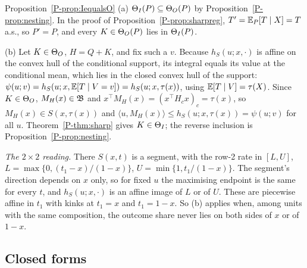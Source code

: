 \begin{proofof}{Proposition~\ref{P-prop:IequalsO}}
(a) $\Theta_I(P)\subseteq\Theta_O(P)$ by Proposition~\ref{P-prop:nesting}. In the proof of
Proposition~\ref{P-prop:sharpreg}, $T'=\mathbb E_P[T\mid X]=T$ a.s., so $P'=P$, and every
$K\in\Theta_O(P)$ lies in $\Theta_I(P)$.

(b) Let $K\in\Theta_O$, $H=Q+K$, and fix such a $v$. Because $h_S(u;x,\cdot)$ is affine on
the convex hull of the conditional support, its integral equals its value at the
conditional mean, which lies in the closed convex hull of the support:
$\psi(u;v)=h_S(u;x,\mathbb E[T\mid V=v])=h_S(u;x,\tau(x))$, using $\mathbb E[T\mid V]=\tau(X)$.
Since $K\in\Theta_O$, $M_H(x)\in\mathfrak B$ and $x^\top M_H(x)=(x^\top H_cx)_c=\tau(x)$, so
$M_H(x)\in S(x,\tau(x))$ and $\langle u,M_H(x)\rangle\le h_S(u;x,\tau(x))=\psi(u;v)$
for all $u$. Theorem~\ref{P-thm:sharp} gives $K\in\Theta_I$; the reverse inclusion is
Proposition~\ref{P-prop:nesting}.

\emph{The $2\times2$ reading.} There $S(x,t)$ is a segment, with the row-2 rate in
$[L,U]$, $L=\max\{0,(t_1-x)/(1-x)\}$, $U=\min\{1,t_1/(1-x)\}$. The segment's direction
depends on $x$ only, so for fixed $u$ the maximising endpoint is the same for every
$t$, and $h_S(u;x,\cdot)$ is an affine image of $L$ or of $U$. These are piecewise
affine in $t_1$ with kinks at $t_1=x$ and $t_1=1-x$. So (b) applies when, among units
with the same composition, the outcome share never lies on both sides of $x$ or of
$1-x$.
\end{proofof}

\subsection{Closed forms}

